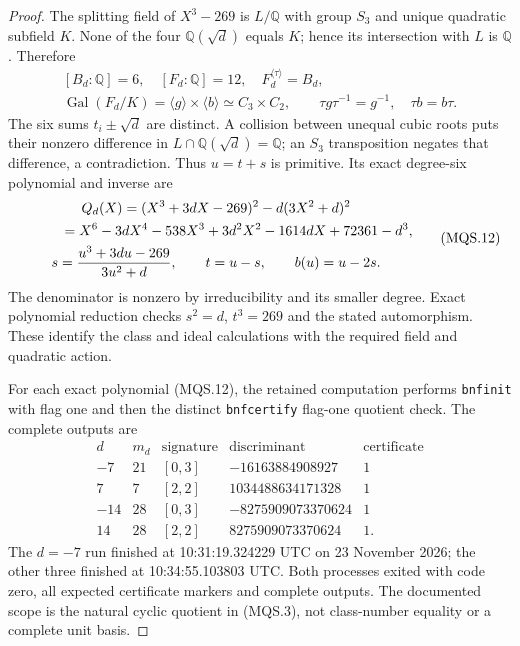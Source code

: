 \begin{proof}
The splitting field of $X^3-269$ is $L/\mathbb Q$ with group
$S_3$ and unique quadratic subfield $K$.
None of the four $\mathbb Q(\sqrt d)$ equals $K$; hence its
intersection with $L$ is $\mathbb Q$.  Therefore
\[
 \begin{gathered}
   [B_d:\mathbb Q]=6,\quad [F_d:\mathbb Q]=12,\quad
   F_d^{\langle\tau\rangle}=B_d,\\
   \operatorname{Gal}(F_d/K)=\langle g\rangle\times\langle b\rangle
               \simeq C_3\times C_2,\qquad
   \tau g\tau^{-1}=g^{-1},\quad\tau b=b\tau.
 \end{gathered}
 \tag{MQS.11}
\]
The six sums $t_i\pm\sqrt d$ are distinct.  A collision
between unequal cubic roots puts their nonzero difference in
$L\cap\mathbb Q(\sqrt d)=\mathbb Q$; an $S_3$ transposition
negates that difference, a contradiction.  Thus $u=t+s$ is
primitive.  Its exact degree-six polynomial and inverse are
\[
 \begin{gathered}
  Q_d(X)=(X^3+3dX-269)^2-d(3X^2+d)^2\\
  \hphantom{Q_d(X)}=X^6-3dX^4-538X^3+3d^2X^2-1614dX+72361-d^3,\\
       s=\frac{u^3+3du-269}{3u^2+d},\qquad t=u-s,
                       \qquad b(u)=u-2s.
 \end{gathered}
 \tag{MQS.12}
\]
The denominator is nonzero by irreducibility and its smaller
degree.  Exact polynomial reduction checks $s^2=d$, $t^3=269$
and the stated automorphism.  These identify the class and ideal
calculations with the required field and quadratic action.

For each exact polynomial (MQS.12), the retained computation
performs \texttt{bnfinit} with flag one and then the distinct
\texttt{bnfcertify} flag-one quotient check.  The complete outputs are
\[
 \begin{array}{r|r|c|r|c}
  d&m_d&\text{signature}&\text{discriminant}&\text{certificate}\\\hline
  -7&21&[0,3]&-16163884908927&1\\
   7&7&[2,2]&1034488634171328&1\\
  -14&28&[0,3]&-8275909073370624&1\\
   14&28&[2,2]&8275909073370624&1.
 \end{array}
 \tag{MQS.12a}
\]
The $d=-7$ run finished at 10:31:19.324229 UTC on
23 November 2026; the other three finished at
10:34:55.103803 UTC.  Both processes exited with code zero,
all expected certificate markers and complete outputs.
The documented scope is the natural cyclic quotient in
(MQS.3), not class-number equality or a complete unit basis.


\end{proof}
